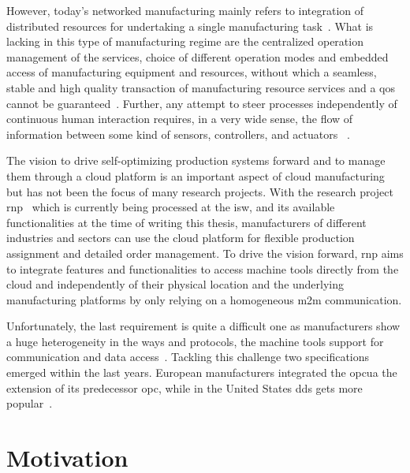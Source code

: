 \documentclass[
a4paper,
twoside,
headsepline,
cleardoublepage=empty,
parskip=half,
draft=false
]{scrbook}
\begin{document}
		However, today's networked manufacturing mainly refers to integration of distributed resources for undertaking a single manufacturing task~\cite{li2010cloud}.
		What is lacking in this type of manufacturing regime are the centralized operation management of the services, choice of different operation modes and embedded access of manufacturing equipment and resources, without which a seamless, stable and high quality transaction of manufacturing resource services and a \gls{qos} cannot be guaranteed~\cite{tao2010theory}.
		Further, any attempt to steer processes independently of continuous human interaction requires, in a very wide sense, the flow of information between some kind of sensors, controllers, and actuators ~\cite{sauter2011evolution}.
		
		The vision to drive self-optimizing production systems forward and to manage them through a cloud platform is an important aspect of cloud manufacturing but has not been the focus of many research projects. 
		With the research project \gls{rnp}~\cite{ellwein2016} which is currently being processed at the \gls{isw}, and its available functionalities at the time of writing this thesis, manufacturers of different industries and sectors can use the cloud platform for flexible production assignment and detailed order management. 
		To drive the vision forward, \gls{rnp} aims to integrate features and functionalities to access machine tools directly from the cloud and independently of their physical location and the underlying manufacturing platforms by only relying on a homogeneous \gls{m2m} communication.
		
		Unfortunately, the last requirement is quite a difficult one as manufacturers show a huge heterogeneity in the ways and protocols, the machine tools support for communication and data access~\cite{xu2012cloud}.
		Tackling this challenge two specifications emerged within the last years.
		European manufacturers integrated the \gls{opcua} the extension of its predecessor \gls{opc}, while in the United States \gls{dds} gets more popular~\cite{niggemann2015data}.
		
		\section{Motivation}\label{sec:motivation}
		
\end{document}
